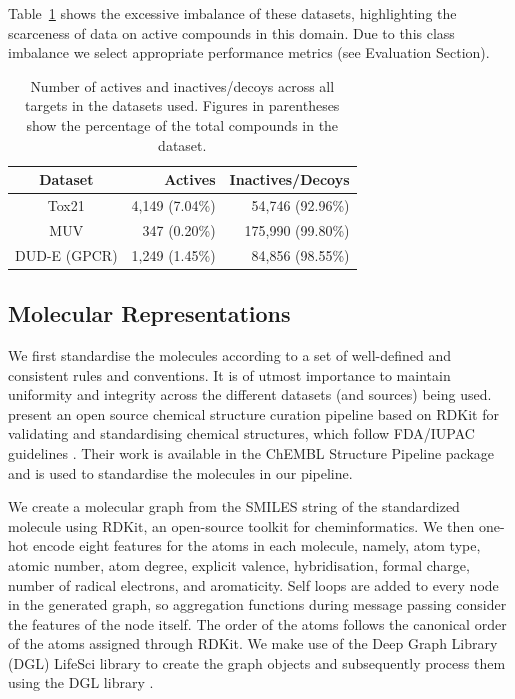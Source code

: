 Table~\ref{table:datasetimbalance} shows the excessive imbalance of these datasets, highlighting the scarceness of data on active compounds in this domain. Due to this class imbalance we select appropriate performance metrics (see Evaluation Section).

\begin{table}[h]
	\centering
	\caption{Number of actives and inactives/decoys across all targets in the datasets used. Figures in parentheses show the percentage of the total compounds in the dataset.}
	\begin{tabular}{@{}crr@{}}
		\hline
		Dataset 		& Actives 			& Inactives/Decoys \\
		\hline
		Tox21 			& 4,149 (7.04\%) 	& 54,746 (92.96\%) \\
		MUV 			& 347 (0.20\%) 		& 175,990 (99.80\%) \\
		DUD-E (GPCR) 	& 1,249 (1.45\%) 	& 84,856 (98.55\%) \\
		\hline				
	\end{tabular}
	\label{table:datasetimbalance}
\end{table}



\subsection{Molecular Representations}

We first standardise the molecules according to a set of well-defined and consistent rules and conventions. It is of utmost importance to maintain uniformity and integrity across the different datasets (and sources) being used. \citet{bento2020open} present an open source chemical structure curation pipeline based on RDKit\citep{rdkit} for validating and standardising chemical structures, which follow FDA/IUPAC guidelines \citep{brecher2006graphical, food2007substance}. Their work is available in the ChEMBL Structure Pipeline package \cite{bento2020open} and is used to standardise the molecules in our pipeline. 

We create a molecular graph from the SMILES string of the standardized molecule using RDKit, an open-source toolkit for cheminformatics. We then one-hot encode eight features for the atoms in each molecule, namely, atom type, atomic number, atom degree, explicit valence, hybridisation, formal charge, number of radical electrons, and aromaticity. Self loops are added to every node in the generated graph, so aggregation functions during message passing consider the features of the node itself. The order of the atoms follows the canonical order of the atoms assigned through RDKit. We make use of the Deep Graph Library (DGL) LifeSci \cite{dgllife} library to create the graph objects and subsequently process them using the DGL library \cite{wang2019dgl}.



